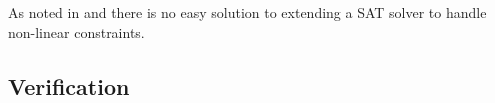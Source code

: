 As noted in \cite{le_berre_dependency_2009} and \cite{leBerre2010} there is no easy solution to extending a SAT solver to handle non-linear constraints.






\subsection{Verification}











